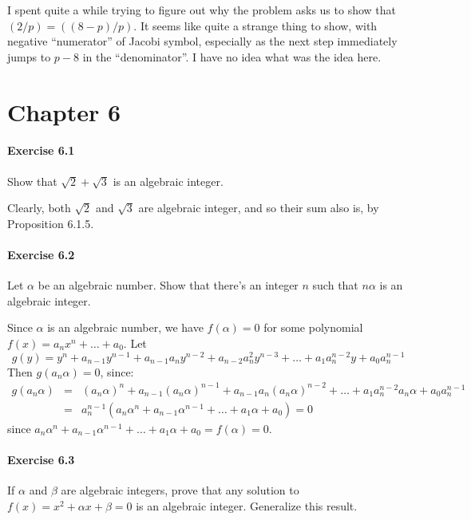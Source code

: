 \documentclass[notitlepage]{article}
\theoremstyle{definition}
\begin{document}
I spent quite a while trying to figure out why the problem asks us to
show that $(2/p) = ((8-p)/p)$. It seems like quite a strange thing to
show, with negative ``numerator'' of Jacobi symbol, especially as the
next step immediately jumps to $p-8$ in the ``denominator''. I have no
idea what was the idea here.

\section{Chapter 6}
\paragraph{Exercise 6.1}
Show that $\sqrt{2} + \sqrt{3}$ is an algebraic integer.

Clearly, both $\sqrt{2}$ and $\sqrt{3}$ are algebraic integer, and so
their sum also is, by Proposition 6.1.5.

\paragraph{Exercise 6.2}
Let $\alpha$ be an algebraic number. Show that there's an integer $n$
such that $n\alpha$ is an algebraic integer.

Since $\alpha$ is an algebraic number, we have $f(\alpha) = 0$ for
some polynomial $f(x) = a_n x^n + \ldots + a_0$. Let
\begin{equation}
g(y) = y^n + a_{n-1} y^{n-1} + a_{n-1} a_n y^{n-2} + a_{n-2} a_n^2 y^{n-3} + \ldots + a_1 a_n^{n-2} y + a_0 a_n^{n-1}
\end{equation}
Then $g(a_n \alpha) = 0$, since: 
\begin{eqnarray}
  g(a_n \alpha) &=& (a_n \alpha)^n + a_{n-1} (a_n \alpha)^{n-1} +
  a_{n-1} a_n (a_n \alpha)^{n-2} + \ldots + a_1 a_n^{n-2} a_n \alpha +
  a_0 a_n^{n-1} \\ &=& a_n^{n-1}(a_n \alpha^n + a_{n-1} \alpha^{n-1} +
  \ldots + a_1 \alpha + a_0) = 0
\end{eqnarray}
since $a_n \alpha^n + a_{n-1} \alpha^{n-1} + \ldots + a_1 \alpha + a_0
= f(\alpha) = 0$.

\paragraph{Exercise 6.3}
If $\alpha$ and $\beta$ are algebraic integers, prove that any
solution to $f(x) = x^2 + \alpha x + \beta = 0$ is an algebraic
integer. Generalize this result.
\end{document}
